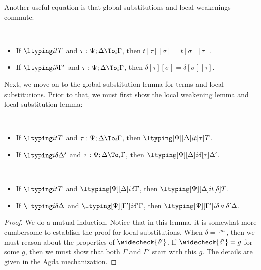 Another useful equation is that global substitutions and local weakenings commute:
\begin{lemma} $ $
  \begin{itemize}
  \item If $\ltyping i t T$ and $\tau : \Psi ; \Delta \To_i \Gamma$, then
    $t[\tau][\sigma] = t[\sigma][\tau]$.
  \item If $\ltyping i \delta {\Gamma'}$ and $\tau : \Psi ; \Delta \To_i \Gamma$, then
    $\delta[\tau][\sigma] = \delta[\sigma][\tau]$.
  \end{itemize}
\end{lemma}

Next, we move on to the global substitution lemma for terms and local substitutions. %
Prior to that, we must first show the local weakening lemma and local substitution lemma:
\begin{lemma} $ $
  \begin{itemize}
  \item If $\ltyping i t T$ and $\tau : \Psi; \Delta \To_i \Gamma$, then
    $\ltyping[\Psi][\Delta] i{t[\tau]} T$. 
  \item If $\ltyping i \delta {\Delta'}$ and $\tau : \Psi; \Delta \To_i \Gamma$, then
    $\ltyping[\Psi][\Delta] i{\delta[\tau]}{\Delta'}$. 
  \end{itemize}
\end{lemma}

\begin{lemma} $ $
  \begin{itemize}
  \item If $\ltyping i t T$ and $\ltyping[\Psi][\Delta] i \delta \Gamma$, then
    $\ltyping[\Psi][\Delta] i{t[\delta]} T$. 
  \item If $\ltyping i \delta \Delta$ and $\ltyping[\Psi][\Gamma'] i {\delta'} \Gamma$, then
    $\ltyping[\Psi][\Gamma'] i{\delta \circ \delta'} {\Delta}$. 
  \end{itemize}
\end{lemma}
\begin{proof}
  We do a mutual induction. %
  Notice that in this lemma, it is somewhat more cumbersome to establish the proof for
  local substitutions. %
  When $\delta = \cdot^m$, then we must reason about the properties of
  $\widecheck{\delta'}$. %
  If $\widecheck{\delta'} = g$ for some $g$, then we must show that both $\Gamma$ and
  $\Gamma'$ start with this $g$. %
  The details are given in the Agda mechanization. 
\end{proof}

